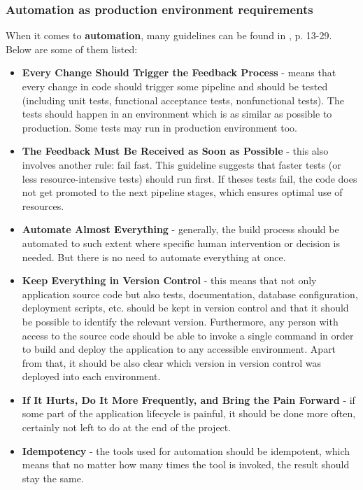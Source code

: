 {\subsubsection{Automation as production environment requirements}
When it comes to \textbf{automation}, many guidelines can be found in \cite{book-cicd}, p. 13-29. Below are some of them listed:
\begin{itemize}
\item \textbf{Every Change Should Trigger the Feedback Process} - means that every change in code should trigger some pipeline and should be tested (including unit tests, functional acceptance tests, nonfunctional tests). The tests should happen in an environment which is as similar as possible to production. Some tests may run in production environment too\cite{book-cicd}\cite{book-iac}.
\item \textbf{The Feedback Must Be Received as Soon as Possible} - this also involves another rule: fail fast. This guideline suggests that faster tests (or less resource-intensive tests) should run first. If theses tests fail, the code does not get promoted to the next pipeline stages, which ensures optimal use of resources\cite{book-cicd}.
\item \textbf{Automate Almost Everything} - generally, the build process should be automated to such extent where specific human intervention or decision is needed. But there is no need to automate everything at once\cite{book-cicd}\cite{book-iac}.
\item \textbf{Keep Everything in Version Control} - this means that not only application source code but also tests, documentation, database configuration, deployment scripts, etc. should be kept in version control and that it should be possible to identify the relevant version. Furthermore, any person with access to the source code should be able to invoke a single command in order to build and deploy the application to any accessible environment. Apart from that, it should be also clear which version in version control was deployed into each environment\cite{book-cicd}.
\item \textbf{If It Hurts, Do It More Frequently, and Bring the Pain Forward} - if some part of the application lifecycle is painful, it should be done more often, certainly not left to do at the end of the project\cite{book-cicd}.
\item \textbf{Idempotency} - the tools used for automation should be idempotent, which means that no matter how many times the tool is invoked, the result should stay the same\cite{book-iac}.
\end{itemize}

}
